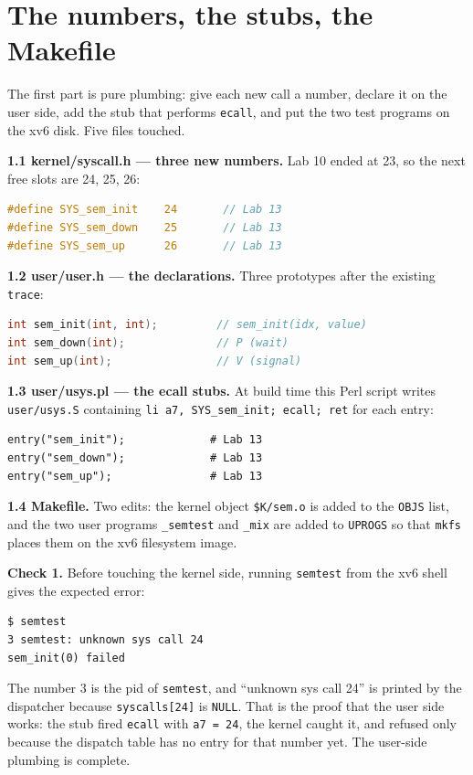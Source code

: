 \documentclass[12pt,a4paper]{article}
\begin{document}
\section{The numbers, the stubs, the Makefile}

The first part is pure plumbing: give each new call a number, declare it on the user side, add the stub that performs \texttt{ecall}, and put the two test programs on the xv6 disk. Five files touched.

\textbf{1.1 kernel/syscall.h --- three new numbers.} Lab 10 ended at 23, so the next free slots are 24, 25, 26:

\begin{lstlisting}[language=C]
#define SYS_sem_init    24       // Lab 13
#define SYS_sem_down    25       // Lab 13
#define SYS_sem_up      26       // Lab 13
\end{lstlisting}

\textbf{1.2 user/user.h --- the declarations.} Three prototypes after the existing \texttt{trace}:

\begin{lstlisting}[language=C]
int sem_init(int, int);         // sem_init(idx, value)
int sem_down(int);              // P (wait)
int sem_up(int);                // V (signal)
\end{lstlisting}

\textbf{1.3 user/usys.pl --- the ecall stubs.} At build time this Perl script writes \texttt{user/usys.S} containing \texttt{li a7, SYS\_sem\_init; ecall; ret} for each entry:

\begin{lstlisting}
entry("sem_init");             # Lab 13
entry("sem_down");             # Lab 13
entry("sem_up");               # Lab 13
\end{lstlisting}

\textbf{1.4 Makefile.} Two edits: the kernel object \texttt{\$K/sem.o} is added to the \texttt{OBJS} list, and the two user programs \texttt{\_semtest} and \texttt{\_mix} are added to \texttt{UPROGS} so that \texttt{mkfs} places them on the xv6 filesystem image.

\textbf{Check 1.} Before touching the kernel side, running \texttt{semtest} from the xv6 shell gives the expected error:

\begin{lstlisting}
$ semtest
3 semtest: unknown sys call 24
sem_init(0) failed
\end{lstlisting}

The number 3 is the pid of \texttt{semtest}, and ``unknown sys call 24'' is printed by the dispatcher because \texttt{syscalls[24]} is \texttt{NULL}. That is the proof that the user side works: the stub fired \texttt{ecall} with \texttt{a7 = 24}, the kernel caught it, and refused only because the dispatch table has no entry for that number yet. The user-side plumbing is complete.
\end{document}
